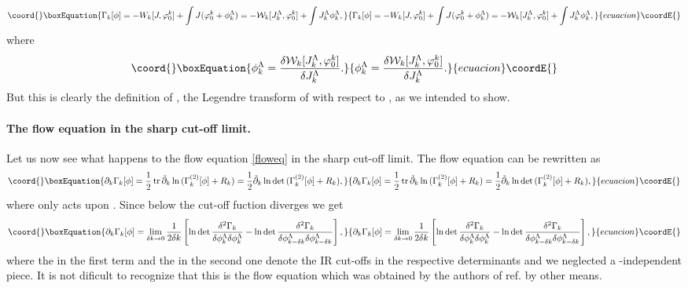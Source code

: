 \documentclass[a4paper,12pt]{article}
\begin{document}
\begin{equation}\coord{}\boxEquation{
               \Gamma_k[\phi]=-W_k[J,\varphi_0^k]+\int J(\varphi_0^k+\phi_k^{\Lambda})=-{\mathcal W}_k [J_k^{\Lambda},\varphi_0^k]+\int J_k^{\Lambda}\phi_k^{\Lambda},
}{
               \Gamma_k[\phi]=-W_k[J,\varphi_0^k]+\int J(\varphi_0^k+\phi_k^{\Lambda})=-{\mathcal W}_k [J_k^{\Lambda},\varphi_0^k]+\int J_k^{\Lambda}\phi_k^{\Lambda},
}{ecuacion}\coordE{}\end{equation}
where
\begin{equation}\coord{}\boxEquation{
               \phi_k^{\Lambda}=\frac{\delta {\mathcal W}_k [J_k^{\Lambda},\varphi_0^k]}{\delta J_k^{\Lambda}}.
}{
               \phi_k^{\Lambda}=\frac{\delta {\mathcal W}_k [J_k^{\Lambda},\varphi_0^k]}{\delta J_k^{\Lambda}}.
}{ecuacion}\coordE{}\end{equation}     
But this is clearly the definition of \coordHE{}, the Legendre transform of \coordHE{} with respect to \coordHE{}, as we intended to show.

\paragraph{The flow equation in the sharp cut-off limit.} Let us now see what happens to the flow equation \eqref{floweq} in the sharp cut-off limit. The flow equation can be rewritten as
\begin{equation}\coord{}\boxEquation{
               \partial_k \Gamma_k[\phi] = \meio\tr \tilde{\partial}_k \ln{(\Gamma_k^{(2)}[\phi] + R_k)}=\meio\tilde{\partial}_k\ln\det{(\Gamma_k^{(2)}[\phi] + R_k)},
}{
               \partial_k \Gamma_k[\phi] = \meio\tr \tilde{\partial}_k \ln{(\Gamma_k^{(2)}[\phi] + R_k)}=\meio\tilde{\partial}_k\ln\det{(\Gamma_k^{(2)}[\phi] + R_k)},
}{ecuacion}\coordE{}\end{equation}
where \coordHE{} only acts upon \coordHE{}. Since below \coordHE{} the cut-off fuction \coordHE{} diverges we get
\begin{equation}\coord{}\boxEquation{
               \partial_k \Gamma_k[\phi] = \lim_{\delta k\to 0}\frac{1}{2\delta k} \left[\ln\det\frac{\delta^2 \Gamma_k}{\delta \phi^{\Lambda}_{k}\delta \phi^{\Lambda}_{k}}-\ln\det\frac{\delta^2 \Gamma_k}{\delta \phi^{\Lambda}_{k-\delta k}\delta \phi^{\Lambda}_{k-\delta k}}\right],
}{
               \partial_k \Gamma_k[\phi] = \lim_{\delta k\to 0}\frac{1}{2\delta k} \left[\ln\det\frac{\delta^2 \Gamma_k}{\delta \phi^{\Lambda}_{k}\delta \phi^{\Lambda}_{k}}-\ln\det\frac{\delta^2 \Gamma_k}{\delta \phi^{\Lambda}_{k-\delta k}\delta \phi^{\Lambda}_{k-\delta k}}\right],
}{ecuacion}\coordE{}\end{equation}
where the \coordHE{} in the first term and the \coordHE{} in the second one denote the IR cut-offs in the respective determinants and we neglected a \myHighlight{$\phi$}\coordHE{}-independent piece. It is not dificult to recognize that this is the flow equation which was obtained by the authors of ref.\cite{Bra02} by other means.\\
\end{document}

